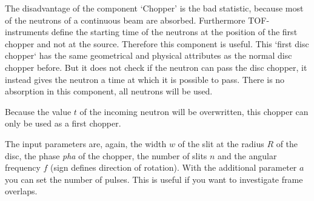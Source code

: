 The disadvantage of the component `Chopper' is the bad statistic,
because most of the neutrons of a continuous beam are absorbed.
Furthermore TOF-instruments define the starting time of the neutrons at
the position of the first chopper and not at the source.  Therefore this
component is useful.  This `first disc chopper` has the same geometrical
and physical attributes as the normal disc chopper before.  But it
does not check if the neutron can pass the disc chopper, it instead gives
the neutron a time at which it is possible to pass. There is no
absorption in this component, all neutrons will be used.

Because the value $t$ of the incoming neutron will be overwritten, this
chopper can only be used as a first chopper.

The input parameters are, again, the width $w$ of the slit at the radius
$R$ of the disc, the phase \textit{pha} of the chopper, the number of
slits $n$ and the angular frequency $f$ (sign defines direction of
rotation). With the additional parameter $a$ you can set the number of
pulses.  This is useful if you want to investigate frame overlaps.

